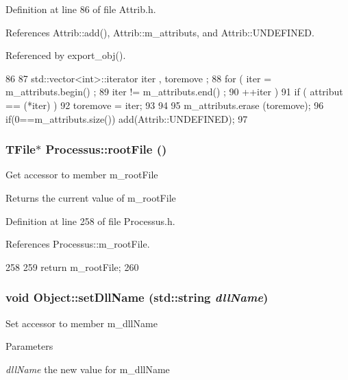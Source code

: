 Definition at line 86 of file Attrib.h.

References Attrib::add(), Attrib::m\_\-attributs, and Attrib::UNDEFINED.

Referenced by export\_\-obj().


\begin{DoxyCode}
86                                {
87     std::vector<int>::iterator iter , toremove ;
88     for ( iter  = m_attributs.begin() ;
89           iter != m_attributs.end()   ;
90           ++iter ) {
91       if ( attribut == (*iter) ) {
92         toremove = iter;
93       }
94     }
95     m_attributs.erase (toremove);
96     if(0==m_attributs.size()) add(Attrib::UNDEFINED);
97   }
\end{DoxyCode}
\hypertarget{classProcessus_a247e8c362ec08422cf53d08dd23b093c}{
\subsubsection[{rootFile}]{\setlength{\rightskip}{0pt plus 5cm}TFile$\ast$ Processus::rootFile ()}}
\label{classProcessus_a247e8c362ec08422cf53d08dd23b093c}
Get accessor to member m\_\-rootFile \begin{DoxyReturn}{Returns}
the current value of m\_\-rootFile 
\end{DoxyReturn}


Definition at line 258 of file Processus.h.

References Processus::m\_\-rootFile.


\begin{DoxyCode}
258                      {
259     return m_rootFile;
260   }
\end{DoxyCode}
\hypertarget{classObject_a870c5af919958c2136623b2d7816d123}{
\subsubsection[{setDllName}]{\setlength{\rightskip}{0pt plus 5cm}void Object::setDllName (std::string {\em dllName})}}
\label{classObject_a870c5af919958c2136623b2d7816d123}
Set accessor to member m\_\-dllName 
\begin{DoxyParams}{Parameters}
\item[{\em dllName}]the new value for m\_\-dllName \end{DoxyParams}


